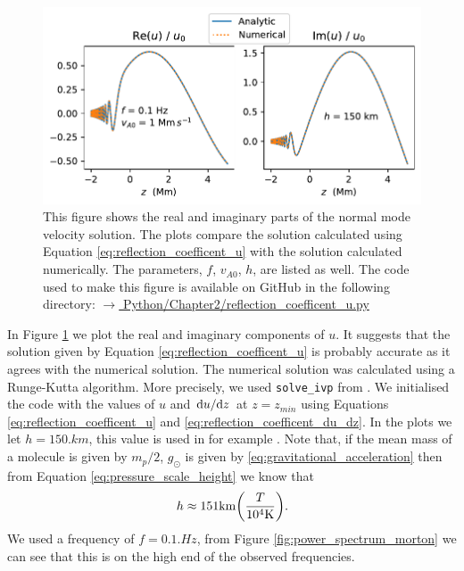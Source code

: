 \begin{figure}
    \centering
    \vspace{-20pt}
    \includegraphics[width=\textwidth]{figures/chapter02/reflection_coefficent_u.pdf}
    \vspace{-20pt}
    \caption{This figure shows the real and imaginary parts of the normal mode velocity solution. The plots compare the solution calculated using Equation \eqref{eq:reflection_coefficent_u} with the solution calculated numerically. The parameters, $f$, $v_{A0}$, $h$, are listed as well. The code used to make this figure is available on GitHub in the following directory:\newline
    \href{https://github.com/aleksyprok/apkp_thesis/blob/main/Python/Chapter2/reflection_coefficent_u.py}{$\rightarrow$ Python/Chapter2/reflection\_coefficent\_u.py}}
    \vspace{-10pt}
    \label{fig:reflection_coefficent_u}
\end{figure}

In Figure \ref{fig:reflection_coefficent_u} we plot the real and imaginary components of $u$. It suggests that the solution given by Equation \eqref{eq:reflection_coefficent_u} is probably accurate as it agrees with the numerical solution. The numerical solution was calculated using a Runge-Kutta algorithm. More precisely, we used \texttt{solve\_ivp} from \citet{SciPy2020}. We initialised the code with the values of $u$ and $\dv*{u}{z}$ at $z=z_{min}$ using Equations \eqref{eq:reflection_coefficent_u} and \eqref{eq:reflection_coefficent_du_dz}. In the plots we let $h=150\si{.km}$, this value is used in for example \citet{Hollweg1984b}. Note that, if the mean mass of a molecule is given by $m_p/2$, $g_\odot$ is given by \eqref{eq:gravitational_acceleration} then from Equation \eqref{eq:pressure_scale_height} we know that
\[h \approx 151\si{.km}\qty(\frac{T}{10^4\si{.K}}).\]
We used a frequency of $f=0.1\si{.Hz}$, from Figure \ref{fig:power_spectrum_morton} we can see that this is on the high end of the observed frequencies.

